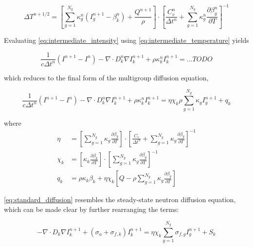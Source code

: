 \documentclass{template}
\begin{document}
\begin{equation}
  \label{eq:intermediate_temperature}\Delta T^{n+1/2} = \left[    \sum_{g=1}^{N_g} \kappa_g^n \left( I_g^{n+1} -  \beta_k^n  \right) +  \frac{Q^{n+1}}{\rho}    \right] \cdot \left[  \frac{ C_v^n}{\Delta t^n}  + \sum_{g=1}^{N_g}\kappa_g^n \frac{\partial \beta_g^n}{\partial T}\right]^{-1}
\end{equation}

Evaluating \autoref{eq:intermediate_intensity} using \autoref{eq:intermediate_temperature} yields

\begin{equation}
  \frac{1}{c \Delta t^n}\left( I^{n+1} - I^n \right)- \nabla \cdot D_k^n \nabla I_k^{n+1} + \rho \kappa_k^n I_k^{n+1} = \dots TODO
\end{equation}

which reduces to the final form of the multigroup diffusion equation,

\begin{equation}\label{eq:standard_diffusion}
  \frac{1}{c \Delta t^n}\left( I^{n+1} - I^n \right)- \nabla \cdot D_k^n \nabla I_k^{n+1} + \rho \kappa_k^n I_k^{n+1} = \eta \chi_k \rho \sum_{g=1}^{N_g}\kappa_g I_g^{n+1} + q_k
\end{equation}

where
\begin{subequations}
  \begin{align}
    \eta   &=  \left[\sum_{g=1}^{N_g}\kappa_g\frac{\partial \beta_g}{\partial T}\right] \cdot \left[ \frac{C_v}{\Delta t^n} + \sum_{g=1}^{N_g}\kappa_g\frac{\partial \beta_g}{\partial T} \right]^{-1} \\
    \chi_k &=  \left[ \kappa_k  \frac{\partial \beta_k}{\partial T}   \right] \cdot \left[\sum_{g=1}^{N_g}\kappa_g\frac{\partial \beta_g}{\partial T}\right]^{-1} \\
    q_k    &=  \rho \kappa_k \beta_k  +  \eta \chi_k \left[ Q - \rho \sum_{g=1}^{N_g}\kappa_g\frac{\partial \beta_g}{\partial T} \right]
  \end{align}
\end{subequations}


\autoref{eq:standard_diffusion} resembles the steady-state neutron diffusion equation, which can be made clear by further rearranging the terms:

\begin{equation}\label{eq:neutron_diffusion}
  -\nabla \cdot D_k \nabla I_k^{n+1} + \left( \sigma_a + \sigma_{f, k} \right)I_k^{n+1} = \eta \chi_k \sum_{g=1}^{N_g}\sigma_{f, g}I_g^{n+1} + S_k
\end{equation}
\end{document}

